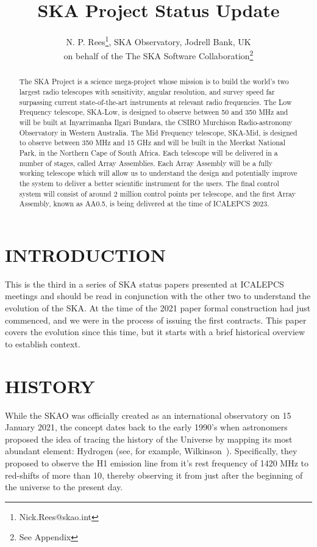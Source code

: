 \documentclass[a4paper,
               biblatex,     %
               keeplastbox,   %
               ]{jacow}
\begin{document}
\title{SKA Project Status Update}

\author{N. P. Rees\thanks{Nick.Rees@skao.int}, SKA Observatory, Jodrell Bank, UK\\
		on behalf of the The SKA Software Collaboration\thanks{See Appendix}}


\maketitle

%
\begin{abstract}
The SKA Project is a science mega-project whose mission is to build the world's two largest radio telescopes with sensitivity, angular resolution, and survey speed far surpassing current state-of-the-art instruments at relevant radio frequencies. The Low Frequency telescope, SKA-Low, is designed to observe between 50 and 350 MHz and will be built at Inyarrimanha Ilgari Bundara, the CSIRO Murchison Radio-astronomy Observatory in Western Australia. The Mid Frequency telescope, SKA-Mid, is designed to observe between 350 MHz and 15 GHz and will be built in the Meerkat National Park, in the Northern Cape of South Africa. Each telescope will be delivered in a number of stages, called Array Assemblies. Each Array Assembly will be a fully working telescope which will allow us to understand the design and potentially improve the system to deliver a better scientific instrument for the users. The final control system will consist of around 2 million control points per telescope, and the first Array Assembly, known as AA0.5, is being delivered at the time of ICALEPCS 2023.
\end{abstract}

\section{INTRODUCTION}
This is the third in a series of SKA status papers presented at ICALEPCS meetings and should be read in conjunction with the other two to understand the evolution of the SKA. At the time of the 2021 paper formal construction had just commenced, and we were in the process of issuing the first contracts. This paper covers the evolution since this time, but it starts with a brief historical overview to establish context.

\section{HISTORY}
While the SKAO was officially created as an international observatory on 15 January 2021, the concept dates back to the early 1990's when astronomers proposed the idea of tracing the history of the Universe by mapping its most abundant element: Hydrogen (see, for example, Wilkinson~\cite{1991ASPC...19..428W}). Specifically, they proposed to observe the H1 emission line from it's rest frequency of 1420 MHz to red-shifts of more than 10, thereby observing it from just after the beginning of the universe to the present day.
\end{document}
